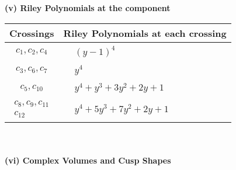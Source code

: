\documentclass[1p]{elsarticle_modified}
\theoremstyle{definition}
\begin{document}
\newpage\renewcommand{\arraystretch}{1}
\flushleft \textbf{(v) Riley Polynomials at the component}\newline \\
\begin{tabular}{m{50pt}|m{274pt}}
Crossings & \hspace{64pt}Riley Polynomials at each crossing \\
\hline $$\begin{aligned}c_{1},c_{2},c_{4}\end{aligned}$$&$\begin{aligned}
&(y-1)^4
\end{aligned}$\\
\hline $$\begin{aligned}c_{3},c_{6},c_{7}\end{aligned}$$&$\begin{aligned}
&y^4
\end{aligned}$\\
\hline $$\begin{aligned}c_{5},c_{10}\end{aligned}$$&$\begin{aligned}
&y^4+y^3+3 y^2+2 y+1
\end{aligned}$\\
\hline $$\begin{aligned}c_{8},c_{9},c_{11}\\c_{12}\end{aligned}$$&$\begin{aligned}
&y^4+5 y^3+7 y^2+2 y+1
\end{aligned}$\\
\hline
\end{tabular}\\~\\
\newpage\flushleft \textbf{(vi) Complex Volumes and Cusp Shapes}
\end{document}
